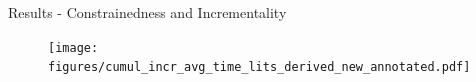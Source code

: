 \documentclass{beamer}
\renewcommand\emph[1]{{\color{vuborange}#1}}
\begin{document}
%
%	
%

\begin{frame}{Results - Constrainedness and Incrementality}
	\begin{figure}
		\texttt{[image: figures/cumul\_incr\_avg\_time\_lits\_derived\_new\_annotated.pdf]}
	\end{figure}
\end{frame}
\end{document}
